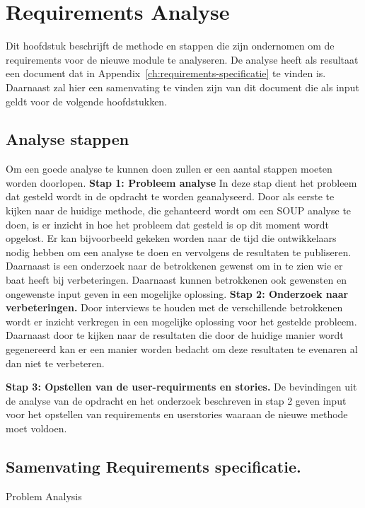 
\chapter{Requirements Analyse}\label{ch:requirements-analyse}
Dit hoofdstuk beschrijft de methode en stappen die zijn ondernomen om de requirements voor de nieuwe module te analyseren. De analyse heeft als resultaat een document dat in Appendix~\ref{ch:requirements-specificatie} te vinden is. Daarnaast zal hier een samenvating te vinden zijn van dit document die als input geldt voor de volgende hoofdstukken.

\section{Analyse stappen}\label{sec:analyse-stappen}
Om een goede analyse te kunnen doen zullen er een aantal stappen  moeten worden doorlopen.
\textbf{Stap 1: Probleem analyse}
In deze stap dient het probleem dat gesteld wordt in de opdracht te worden geanalyseerd. Door als eerste te kijken naar de huidige methode, die gehanteerd wordt om een SOUP analyse te doen, is er inzicht in hoe het probleem dat gesteld is op dit moment wordt opgelost. Er kan bijvoorbeeld gekeken worden naar de tijd die ontwikkelaars nodig hebben om een analyse te doen en vervolgens de resultaten te publiseren. Daarnaast is een onderzoek naar de betrokkenen gewenst om in te zien wie er baat heeft bij verbeteringen. Daarnaast kunnen betrokkenen ook gewensten en ongewenste input geven in een mogelijke oplossing.
\textbf{Stap 2: Onderzoek naar verbeteringen.}
Door interviews te houden met de verschillende betrokkenen wordt er inzicht verkregen in een mogelijke oplossing voor het gestelde probleem. Daarnaast door te kijken naar de resultaten die door de huidige manier wordt gegenereerd kan er een manier worden bedacht om deze resultaten te evenaren al dan niet te verbeteren.

\textbf{Stap 3: Opstellen van de user-requirments en stories.}
De bevindingen uit de analyse van de opdracht en het onderzoek beschreven in stap 2 geven input voor het opstellen van requirements en userstories waaraan de nieuwe methode moet voldoen.

\section{Samenvating Requirements specificatie.}



Problem Analysis


